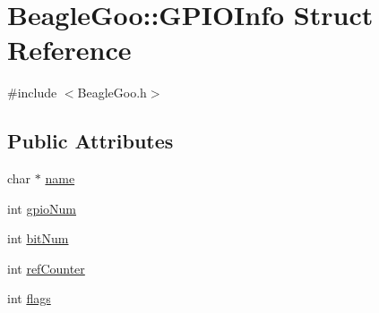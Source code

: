 \hypertarget{struct_beagle_goo_1_1_g_p_i_o_info}{\section{Beagle\-Goo\-:\-:G\-P\-I\-O\-Info Struct Reference}
\label{struct_beagle_goo_1_1_g_p_i_o_info}
}


{\ttfamily \#include $<$Beagle\-Goo.\-h$>$}

\subsection*{Public Attributes}
\begin{DoxyCompactItemize}
\item 
char $\ast$ \hyperlink{struct_beagle_goo_1_1_g_p_i_o_info_aa887aa95188facb1a445920fb544134a}{name}
\item 
int \hyperlink{struct_beagle_goo_1_1_g_p_i_o_info_a870d8a3d36706dd366eea2299ccb29fd}{gpio\-Num}
\item 
int \hyperlink{struct_beagle_goo_1_1_g_p_i_o_info_a31959d0d24502777f3286e7ccb9c8e62}{bit\-Num}
\item 
int \hyperlink{struct_beagle_goo_1_1_g_p_i_o_info_af3bbf6d94585ef4a62bd579fef8564ac}{ref\-Counter}
\item 
int \hyperlink{struct_beagle_goo_1_1_g_p_i_o_info_afeb1ff6e6ad263177a9b1bb82e7a0043}{flags}
\end{DoxyCompactItemize}


